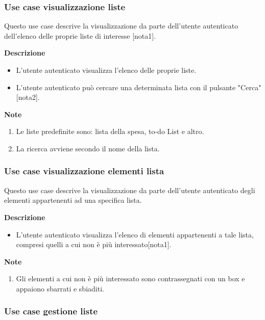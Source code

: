 \documentclass[a4paper,12pt]{article}
\begin{document}
\subsubsection*{Use case visualizzazione liste}

Questo use case descrive la visualizzazione da parte dell'utente autenticato dell'elenco delle proprie liste di interesse [nota1].

\textbf{Descrizione}
\begin{itemize} \setlength\itemsep{0.01em}
\item L'utente autenticato visualizza l'elenco delle proprie liste.
\item L'utente autenticato può cercare una determinata lista con il pulsante "Cerca" [nota2].
\end{itemize}

\textbf{Note}
\begin{enumerate} \setlength\itemsep{0.01em}
\item Le liste predefinite sono: lista della spesa, to-do List e altro.
\item La ricerca avviene secondo il nome della lista.
\end{enumerate}




\subsubsection*{Use case visualizzazione elementi lista}

Questo use case descrive la visualizzazione da parte dell'utente autenticato degli elementi appartenenti ad una specifica lista.

\textbf{Descrizione}
\begin{itemize} \setlength\itemsep{0.01em}
\item L'utente autenticato visualizza l'elenco di elementi appartenenti a tale lista, compresi quelli a cui non è più interessato[nota1].
\end{itemize}

\textbf{Note}
\begin{enumerate} \setlength\itemsep{0.01em}
\item Gli elementi a cui non è più interessato sono contrassegnati con un box e appaiono sbarrati e sbiaditi.
\end{enumerate}



\subsubsection*{Use case gestione liste}
\end{document}

